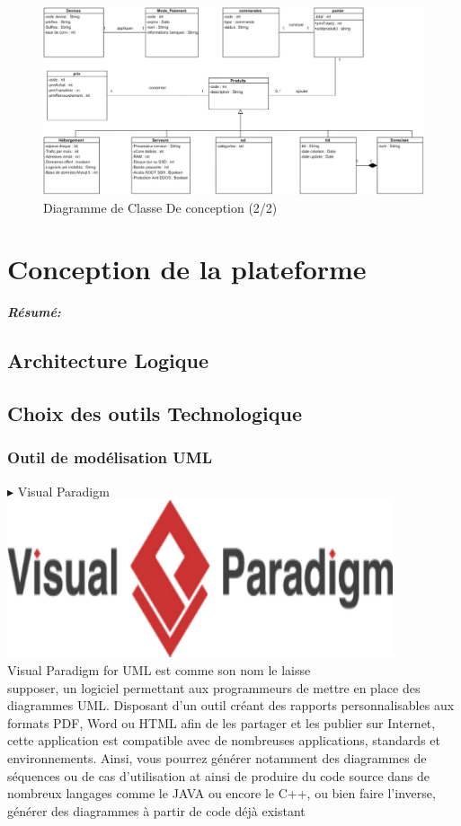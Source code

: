 \documentclass[a4paper, 12pt]{report}
\begin{document}
	\begin{figure}[H]
	\centering
	\includegraphics{img/diagclasse/4}
	\caption{Diagramme de Classe De conception (2/2)}
	\label{Tux}
\end{figure}
\chapter{ Conception de la plateforme }
\textit{\textbf{Résumé:} }
\setcounter{minitocdepth}{1}
\minitoc

	\section{Architecture Logique}

\section{Choix des outils Technologique}
\subsection{Outil de modélisation UML}
\noindent $\blacktriangleright$ Visual Paradigm
\\
\includegraphics{img/outils/1}
\\
\noindent Visual Paradigm for UML est comme son nom le laisse
\\
 supposer, un logiciel permettant aux programmeurs de mettre en place des diagrammes UML. Disposant d’un outil créant des rapports personnalisables aux formats PDF, Word ou HTML afin de les partager et les publier sur Internet, cette application est compatible avec de nombreuses applications, standards et environnements. Ainsi, vous pourrez générer notamment des diagrammes de séquences ou de cas d’utilisation at ainsi de produire du code source dans de nombreux langages comme le JAVA ou encore le C++, ou bien faire l’inverse, générer des diagrammes à partir de code déjà existant
\end{document}
